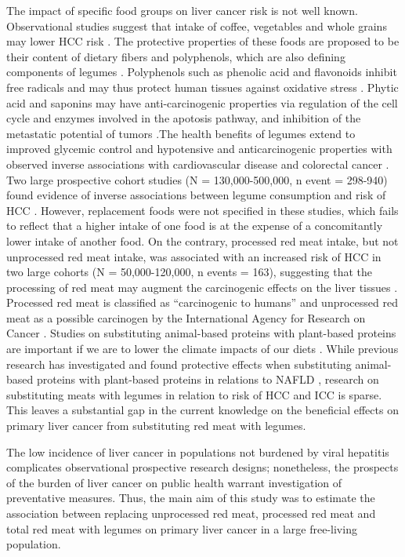 \documentclass[nutrients,article,submit,moreauthors,pdftex]{Definitions/mdpi}
\begin{document}
The impact of specific food groups on liver cancer risk is not well
known. Observational studies suggest that intake of coffee, vegetables
and whole grains may lower HCC risk \citep{zhang2013, yang2014, Liu2021, Bhurwal2020}. The protective properties of these foods are proposed to
be their content of dietary fibers and polyphenols, which are also
defining components of legumes \citep{rebello2014}. Polyphenols such as
phenolic acid and flavonoids inhibit free radicals and may thus protect
human tissues against oxidative stress \citep{scalbert2002, bouchenak2013}.
Phytic acid and saponins may have anti-carcinogenic properties via
regulation of the cell cycle and enzymes involved in the apotosis
pathway, and inhibition of the metastatic potential of tumors
\citep{Vucenik2006, campos-vega2010, rebello2014}.The health benefits of
legumes extend to improved glycemic control and hypotensive and
anticarcinogenic properties with observed inverse associations with
cardiovascular disease and colorectal cancer \citep{viguiliouk2019, jin2022}. Two large prospective cohort studies (N = 130,000-500,000, n
event = 298-940) found evidence of inverse associations between legume
consumption and risk of HCC \citep{zhang2013, Liu2021}. However, replacement
foods were not specified in these studies, which fails to reflect that a
higher intake of one food is at the expense of a concomitantly lower
intake of another food. On the contrary, processed red meat intake, but
not unprocessed red meat intake, was associated with an increased risk
of HCC in two large cohorts (N = 50,000-120,000, n events = 163),
suggesting that the processing of red meat may augment the carcinogenic
effects on the liver tissues \citep{Ma2019}. Processed red meat is classified
as ``carcinogenic to humans'' and unprocessed red meat as a possible
carcinogen by the International Agency for Research on Cancer
\citep{Bouvard2015}. Studies on substituting animal-based proteins with
plant-based proteins are important if we are to lower the climate
impacts of our diets \citep{RN71}. While previous research has investigated
and found protective effects when substituting animal-based proteins
with plant-based proteins in relations to NAFLD \citep{Zhang2023}, research
on substituting meats with legumes in relation to risk of HCC and ICC is
sparse. This leaves a substantial gap in the current knowledge on the
beneficial effects on primary liver cancer from substituting red meat
with legumes.

The low incidence of liver cancer in populations not burdened by viral
hepatitis complicates observational prospective research designs;
nonetheless, the prospects of the burden of liver cancer on public
health warrant investigation of preventative measures. Thus, the main
aim of this study was to estimate the association between replacing
unprocessed red meat, processed red meat and total red meat with legumes
on primary liver cancer in a large free-living population.
\end{document}
